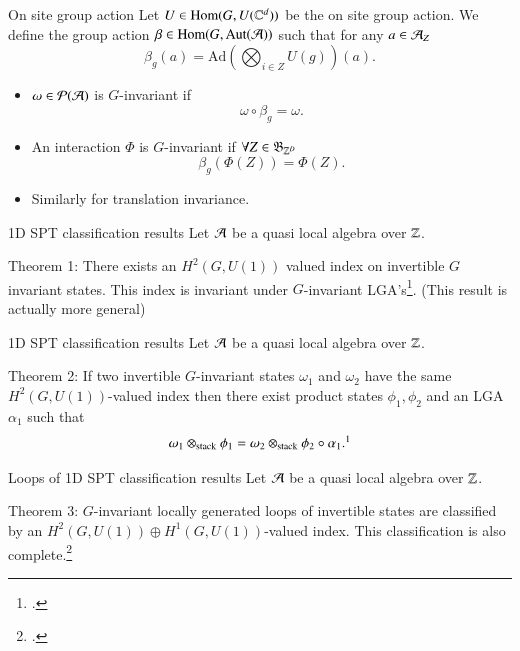 \documentclass{beamer}
\begin{document}
\begin{frame}{On site group action}
Let $U\in\textrm{Hom}(G,U(\CC^d))$ be the on site group action. We define the group action $\beta\in\textrm{Hom}(G,\textrm{Aut}(\AA))$ such that for any $a\in\AA_Z$
\[\beta_g(a)=\textrm{Ad}\left(\bigotimes_{i\in Z}U(g)\right)(a).\]
\pause
\begin{itemize}
\item $\omega\in\mathcal{P}(\AA)$ is $G$-invariant if
\[\omega\circ\beta_g=\omega.\]
\pause
\item An interaction $\Phi$ is $G$-invariant if $\forall Z\in\mathfrak{B}_{\ZZ^D}$
\[\beta_g(\Phi(Z))=\Phi(Z).\]
\pause
\item Similarly for translation invariance.
\end{itemize}
\end{frame}

\begin{frame}{1D SPT classification results}
Let $\AA$ be a quasi local algebra over $\ZZ$.
\begin{block}{Theorem 1:}
There exists an $H^2(G,U(1))$ valued index on invertible $G$ invariant states. This index is invariant under $G$-invariant LGA's\footcite{ogata2019classification}. (This result is actually more general)
\end{block}
\end{frame}

\begin{frame}{1D SPT classification results}
Let $\AA$ be a quasi local algebra over $\ZZ$.
\begin{block}{Theorem 2:}
If two invertible $G$-invariant states $\omega_1$ and $\omega_2$ have the same $H^2(G,U(1))$-valued index then there exist product states $\phi_1,\phi_2$ and an LGA $\alpha_1$ such that
\[\omega_1\otimes_{\text{stack}}\phi_1=\omega_2\otimes_{\text{stack}}\phi_2\circ\alpha_1.\footcite{kapustin2021classification}\]
\end{block}
\end{frame}

\begin{frame}{Loops of 1D SPT classification results}
Let $\AA$ be a quasi local algebra over $\ZZ$.
\begin{block}{Theorem 3:}
$G$-invariant locally generated loops of invertible states are classified by an $H^2(G,U(1))\oplus H^1(G,U(1))$-valued index. This classification is also complete.\footcite{https://doi.org/10.48550/arxiv.2204.03763}
\end{block}
\end{frame}
\end{document}
